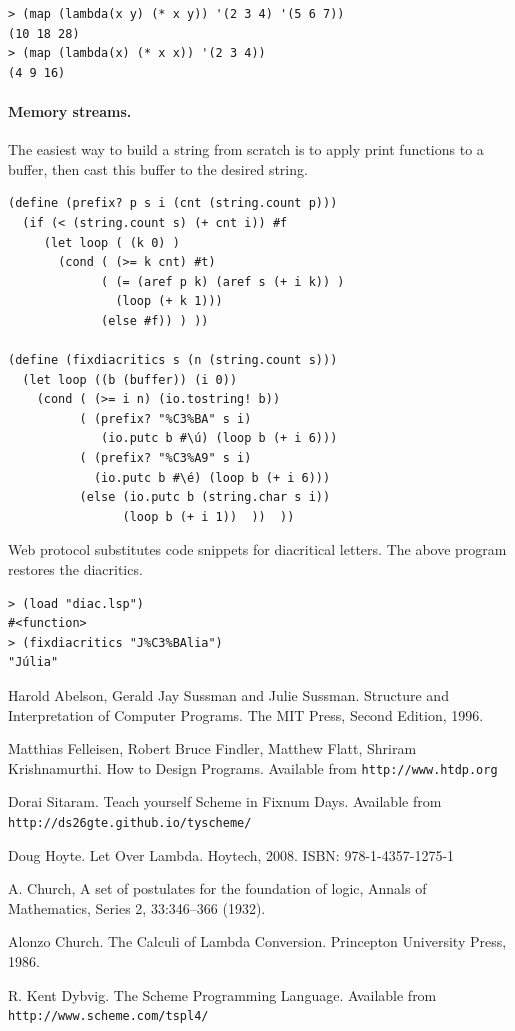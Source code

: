\documentclass[a4paper,12pt]{book}
\begin{document}
\begin{verbatim}
> (map (lambda(x y) (* x y)) '(2 3 4) '(5 6 7))
(10 18 28)
> (map (lambda(x) (* x x)) '(2 3 4))
(4 9 16)
\end{verbatim}

\paragraph{Memory streams.} The easiest way to build a
string from scratch is to apply print functions 
to a buffer, then cast this buffer to the desired
string.

\begin{verbatim}
(define (prefix? p s i (cnt (string.count p)))
  (if (< (string.count s) (+ cnt i)) #f 
     (let loop ( (k 0) )
       (cond ( (>= k cnt) #t)
             ( (= (aref p k) (aref s (+ i k)) )
               (loop (+ k 1)))
             (else #f)) ) ))
            
(define (fixdiacritics s (n (string.count s)))
  (let loop ((b (buffer)) (i 0))
    (cond ( (>= i n) (io.tostring! b))
          ( (prefix? "%C3%BA" s i)
             (io.putc b #\ú) (loop b (+ i 6)))
          ( (prefix? "%C3%A9" s i)
            (io.putc b #\é) (loop b (+ i 6)))
          (else (io.putc b (string.char s i))
                (loop b (+ i 1))  ))  ))
\end{verbatim}
Web protocol substitutes code snippets for
diacritical letters. The above program
restores the diacritics.

\begin{verbatim}
> (load "diac.lsp")
#<function>
> (fixdiacritics "J%C3%BAlia")
"Júlia"
\end{verbatim}
\begin{thebibliography}{99}


 Harold Abelson, Gerald Jay Sussman and
Julie Sussman. Structure and Interpretation of
Computer Programs. The MIT Press, Second Edition, 1996.

 Matthias Felleisen,
Robert Bruce Findler, Matthew Flatt, Shriram Krishnamurthi.
How to Design Programs.
Available from \verb|http://www.htdp.org|

 Dorai Sitaram. Teach yourself Scheme
in Fixnum Days. Available
from \verb|http://ds26gte.github.io/tyscheme/|

 Doug Hoyte. Let Over Lambda. Hoytech, 2008. ISBN: 978-1-4357-1275-1

 A. Church, A set of postulates for the foundation of logic, Annals of Mathematics, Series 2, 33:346–366 (1932).

 Alonzo Church. The Calculi of Lambda Conversion. Princepton University Press, 1986.

 R. Kent Dybvig. The Scheme Programming Language.
Available from \verb|http://www.scheme.com/tspl4/|

\end{thebibliography}

\printindex
\end{document}
